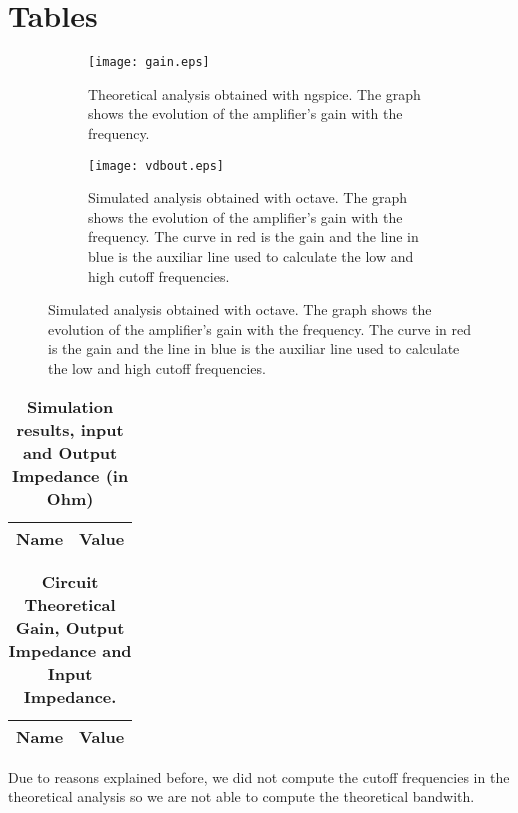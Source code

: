 \section{Tables}
\label{sec:tables}

\begin{figure}[H]
\centering
\caption{Plots from theoretical and simulation analysis}
\begin{subfigure}{\textwidth}
\centering
\texttt{[image: gain.eps]}
\caption{Theoretical analysis obtained with ngspice. The graph shows the evolution of the amplifier's gain with the frequency.}
\end{subfigure}
\begin{subfigure}{\textwidth}
\centering
\texttt{[image: vdbout.eps]}
\caption{Simulated analysis obtained with octave. The graph shows the evolution of the amplifier's gain with the frequency. The curve in red is the gain and the line in blue is the auxiliar line used to calculate the low and high cutoff frequencies.}
\end{subfigure}
\end{figure}


\begin{table}[H]
\centering
\begin{tabular}{|l|l|}
\hline
{\bf Name} & {\bf Value} \\ \hline
    
    
    
\end{tabular}
\caption{\textbf{Simulation results, input and Output Impedance (in Ohm) }}
\end{table}

\begin{table}[H]
\centering
\begin{tabular}{|l|l|}
\hline
{\bf Name} & {\bf Value} \\ \hline
    
\end{tabular}
\caption{\textbf{Circuit Theoretical Gain, Output Impedance and Input Impedance.}}
\end{table}

Due to reasons explained before, we did not compute the cutoff frequencies in the theoretical analysis so we are not able to compute the theoretical bandwith.
